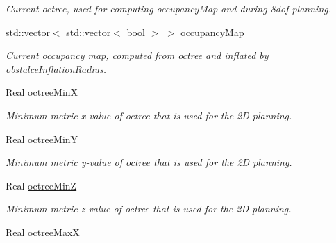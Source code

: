 \begin{DoxyCompactItemize}
\begin{DoxyCompactList}\small\item\em Current octree, used for computing occupancy\-Map and during 8dof planning. \end{DoxyCompactList}\item 
\hypertarget{classSquirrelMotionPlanner_1_1Planner_a95a04f970e8537226dd739cd98000af4}{std\-::vector$<$ std\-::vector$<$ bool $>$ $>$ \hyperlink{classSquirrelMotionPlanner_1_1Planner_a95a04f970e8537226dd739cd98000af4}{occupancy\-Map}}\label{classSquirrelMotionPlanner_1_1Planner_a95a04f970e8537226dd739cd98000af4}

\begin{DoxyCompactList}\small\item\em Current occupancy map, computed from octree and inflated by obstalce\-Inflation\-Radius. \end{DoxyCompactList}\item 
\hypertarget{classSquirrelMotionPlanner_1_1Planner_ae16ef85b49f65c1542a3693233268710}{Real \hyperlink{classSquirrelMotionPlanner_1_1Planner_ae16ef85b49f65c1542a3693233268710}{octree\-Min\-X}}\label{classSquirrelMotionPlanner_1_1Planner_ae16ef85b49f65c1542a3693233268710}

\begin{DoxyCompactList}\small\item\em Minimum metric x-\/value of octree that is used for the 2\-D planning. \end{DoxyCompactList}\item 
\hypertarget{classSquirrelMotionPlanner_1_1Planner_a829d45c3d2d2c1cf35f58f1e838aeb57}{Real \hyperlink{classSquirrelMotionPlanner_1_1Planner_a829d45c3d2d2c1cf35f58f1e838aeb57}{octree\-Min\-Y}}\label{classSquirrelMotionPlanner_1_1Planner_a829d45c3d2d2c1cf35f58f1e838aeb57}

\begin{DoxyCompactList}\small\item\em Minimum metric y-\/value of octree that is used for the 2\-D planning. \end{DoxyCompactList}\item 
\hypertarget{classSquirrelMotionPlanner_1_1Planner_af4b14098727a16a4fc44a12cc91e269e}{Real \hyperlink{classSquirrelMotionPlanner_1_1Planner_af4b14098727a16a4fc44a12cc91e269e}{octree\-Min\-Z}}\label{classSquirrelMotionPlanner_1_1Planner_af4b14098727a16a4fc44a12cc91e269e}

\begin{DoxyCompactList}\small\item\em Minimum metric z-\/value of octree that is used for the 2\-D planning. \end{DoxyCompactList}\item 
\hypertarget{classSquirrelMotionPlanner_1_1Planner_aa15972180e604f20990aab54ada681d0}{Real \hyperlink{classSquirrelMotionPlanner_1_1Planner_aa15972180e604f20990aab54ada681d0}{octree\-Max\-X}}\label{classSquirrelMotionPlanner_1_1Planner_aa15972180e604f20990aab54ada681d0}


\end{DoxyCompactItemize}
